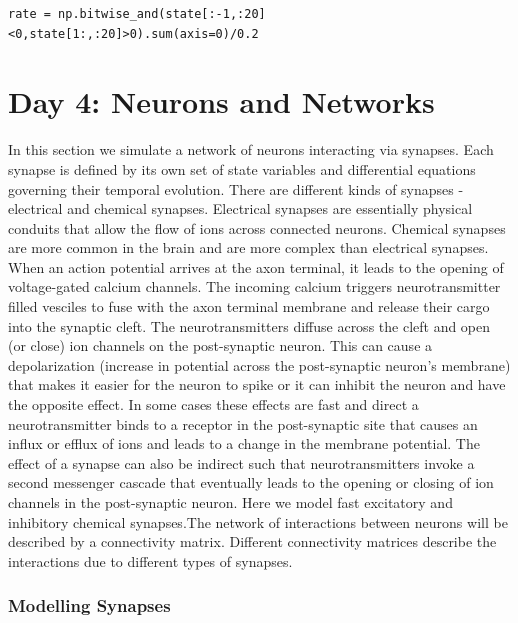 \documentclass[10pt,letterpaper]{article}
\begin{document}
\begin{verbatim}
rate = np.bitwise_and(state[:-1,:20]<0,state[1:,:20]>0).sum(axis=0)/0.2
\end{verbatim}

\section*{Day 4: Neurons and Networks}
In this section we simulate a network of neurons interacting via synapses. Each synapse is defined by its own set of state variables and differential equations governing their temporal evolution. There are different kinds of synapses - electrical and chemical synapses. Electrical synapses are essentially physical conduits that allow the flow of ions across connected neurons. Chemical synapses are more common in the brain and are more complex than electrical synapses. When an action potential arrives at the axon terminal, it leads to the opening of voltage-gated calcium channels. The incoming calcium triggers neurotransmitter filled vesciles to fuse with the axon terminal membrane and release their cargo into the synaptic cleft. The neurotransmitters diffuse across the cleft and open (or close) ion channels on the post-synaptic neuron. This can cause a depolarization (increase in potential across the post-synaptic neuron's membrane) that makes it easier for the neuron to spike or it can inhibit the neuron and have the opposite effect. In some cases these effects are fast and direct \textemdash a neurotransmitter binds to a receptor in the post-synaptic site that causes an influx or efflux of ions and leads to a change in the membrane potential. The effect of a synapse can also be indirect such that neurotransmitters invoke a second messenger cascade that eventually leads to the opening or closing of ion channels in the post-synaptic neuron. Here we model fast excitatory and inhibitory chemical synapses.The network of interactions between neurons will be described by a connectivity matrix. Different connectivity matrices describe the interactions due to different types of synapses. 

\subsubsection*{Modelling Synapses}
\end{document}
